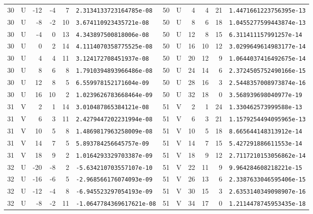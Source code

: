 \begin{longtable}{rcrrrl|rcrrrl}
30 & U & -12 & -4 & 7 & \texttt{2.3134133723164785e-08} & 50 & U & 4 & 4 & 21 & \texttt{1.4471661223756395e-13}\\
30 & U & -8 & -2 & 10 & \texttt{3.674110923435721e-08} & 50 & U & 8 & 6 & 18 & \texttt{1.0455277599443874e-13}\\
30 & U & -4 & 0 & 13 & \texttt{4.343897500818006e-08} & 50 & U & 12 & 8 & 15 & \texttt{6.311411157991257e-14}\\
30 & U & 0 & 2 & 14 & \texttt{4.1114070358775525e-08} & 50 & U & 16 & 10 & 12 & \texttt{3.0299649614983177e-14}\\
30 & U & 4 & 4 & 11 & \texttt{3.124172708451937e-08} & 50 & U & 20 & 12 & 9 & \texttt{1.0644037416492675e-14}\\
30 & U & 8 & 6 & 8 & \texttt{1.7910394893966486e-08} & 50 & U & 24 & 14 & 6 & \texttt{2.3724505752490166e-15}\\
30 & U & 12 & 8 & 5 & \texttt{6.559978152171604e-09} & 50 & U & 28 & 16 & 3 & \texttt{2.5448357008973874e-16}\\
30 & U & 16 & 10 & 2 & \texttt{1.0239626783668464e-09} & 50 & U & 32 & 18 & 0 & \texttt{3.568939698040977e-19}\\
31 & V & 2 & 1 & 14 & \texttt{3.010487865384121e-08} & 51 & V & 2 & 1 & 24 & \texttt{1.330462573999588e-13}\\
31 & V & 6 & 3 & 11 & \texttt{2.4279447202231994e-08} & 51 & V & 6 & 3 & 21 & \texttt{1.1579254494095965e-13}\\
31 & V & 10 & 5 & 8 & \texttt{1.4869817963258009e-08} & 51 & V & 10 & 5 & 18 & \texttt{8.665644148313912e-14}\\
31 & V & 14 & 7 & 5 & \texttt{5.893784256645757e-09} & 51 & V & 14 & 7 & 15 & \texttt{5.427291886611553e-14}\\
31 & V & 18 & 9 & 2 & \texttt{1.0164293329703387e-09} & 51 & V & 18 & 9 & 12 & \texttt{2.7117210153056862e-14}\\
32 & U & -20 & -8 & 2 & \texttt{-5.634210703557107e-10} & 51 & V & 22 & 11 & 9 & \texttt{9.964284608218221e-15}\\
32 & U & -16 & -6 & 5 & \texttt{-2.968566176074093e-09} & 51 & V & 26 & 13 & 6 & \texttt{2.3387633046595406e-15}\\
32 & U & -12 & -4 & 8 & \texttt{-6.945523297054193e-09} & 51 & V & 30 & 15 & 3 & \texttt{2.6353140349098907e-16}\\
32 & U & -8 & -2 & 11 & \texttt{-1.0647784369617621e-08} & 51 & V & 34 & 17 & 0 & \texttt{1.2114478745953435e-18}\\

\end{longtable}
